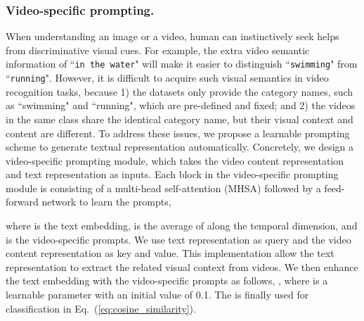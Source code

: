 \documentclass[runningheads]{llncs}
\begin{document}
\subsubsection{Video-specific prompting.} When understanding an image or a video, human can instinctively seek helps from  discriminative visual cues. For example, the extra video semantic information of ``\texttt{in the water}" will make it easier to distinguish ``\texttt{swimming}" from ``\texttt{running}". However, it is difficult to acquire such visual semantics in video recognition tasks, because 1) the datasets only provide the category names, such as ``swimming" and ``running", which are pre-defined and fixed; and 2) the videos in the same class share the identical category name, but their visual context and content are different. To address these issues, we propose a learnable prompting scheme to generate textual representation automatically. Concretely, we design a video-specific prompting module, which takes the video content representation  and text representation  as inputs. Each block in the video-specific prompting module is consisting of a multi-head self-attention (MHSA) \cite{vaswani2017attention} followed by a feed-forward network to learn the prompts,

where  is the text embedding,  is the average of  along the temporal dimension, and  is the video-specific prompts. We use text representation  as query and the video content representation  as key and value. This implementation allow the text representation to extract the related visual context from videos. We then enhance the text embedding  with the video-specific prompts  as follows, , where  is a learnable parameter with an initial value of 0.1. The  is finally used for classification in Eq.~(\ref{eq:cosine_similarity}).
\end{document}
